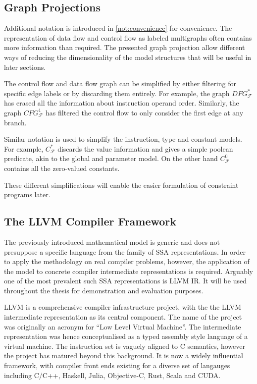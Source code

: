 \subsection{Graph Projections}

    Additional notation is introduced in \autoref{not:convenience} for
    convenience.
    The representation of data flow and control flow as labeled multigraphs
    often contains more information than required.
    The presented graph projection allow different ways of reducing the
    dimensionality of the model structures that will be useful in later
    sections.

    The control flow and data flow graph can be simplified by either filtering
    for specific edge labels or by discarding them entirely.
    For example, the graph $DFG_\mathcal F^*$ has erased all the information
    about instruction operand order.
    Similarly, the graph $CFG_\mathcal F^1$ has filtered the control flow to
    only consider the first edge at any branch.

    Similar notation is used to simplify the instruction, type and constant
    models.
    For example, $C_\mathcal F^*$ discards the value information and gives a
    simple poolean predicate, akin to the global and parameter model.
    On the other hand $C_\mathcal F^0$ contains all the zero-valued constants.

    These different simplifications will enable the easier formulation of
    constraint programs later.

\subsection{The LLVM Compiler Framework}

    The previously introduced mathematical model is generic and does not
    presuppose a specific language from the family of SSA representations.
    In order to apply the methodology on real compiler problems, however, the
    application of the model to concrete compiler intermediate representations
    is required.
    Arguably one of the most prevalent such SSA representations is LLVM IR.
    It will be used throughout the thesis for demonstration and evaluation
    purposes.

    LLVM is a comprehensive compiler infrastructure project, with the the LLVM
    intermediate representation as its central component.
    The name of the project was originally an acronym for
    ``Low Level Virtual Machine''.
    The intermediate representation was hence conceptualised as a typed assembly
    style language of a virtual machine.
    The instruction set is vaguely aligned to C semantics, however the project
    has matured beyond this background.
    It is now a widely influential framework, with compiler front ends existing
    for a diverse set of langauges including C/C++, Haskell, Julia, Objective-C,
    Rust, Scala and CUDA.

